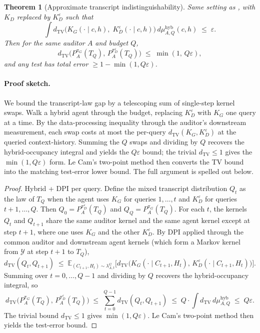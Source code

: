 \documentclass{article}
\theoremstyle{plain}
\newtheorem{theorem}{Theorem}
\theoremstyle{definition}
\theoremstyle{remark}
\newcommand{\TV}{\mathrm{TV}}
\newcommand{\dtv}{d_{\TV}}
\newcommand{\Y}{\mathcal{Y}}
\newcommand{\PpiA}[1]{P_A^{\pi_{#1}}}
\begin{document}
\begin{theorem}[Approximate transcript indistinguishability]\label{thm:approx}
Same setting as , with $K_D$ replaced by
$K_D^\varepsilon$ such that
\begin{equation}\label{eq:hybrid-cond}
\int \dtv\!\big(K_G(\cdot \mid c, h),\; K_D^\varepsilon(\cdot \mid c, h)\big)\, d\mu_{A, Q}^{\mathrm{hyb}}(c, h) \;\le\; \varepsilon.
\end{equation}
Then for the same auditor $A$ and budget $Q$,
\[
\dtv\big(\PpiA{G}(T_Q),\, P_A^{\pi_D^\varepsilon}(T_Q)\big) \;\le\; \min(1,\, Q\varepsilon),
\]
and any test has total error $\ge 1 - \min(1, Q\varepsilon)$.
\end{theorem}

\paragraph{Proof sketch.}
We bound the transcript-law gap by a telescoping sum of single-step kernel
swaps. Walk a hybrid agent through the budget, replacing $K_D^\varepsilon$
with $K_G$ one query at a time. By the data-processing inequality through
the auditor's downstream measurement, each swap costs at most the per-query
$\dtv(K_G, K_D^\varepsilon)$ at the queried context-history. Summing the
$Q$ swaps and dividing by $Q$ recovers the hybrid-occupancy integral and
yields the $Q\varepsilon$ bound; the trivial $\dtv \le 1$ gives the
$\min(1, Q\varepsilon)$ form. Le Cam's two-point method then converts the
TV bound into the matching test-error lower bound. The full argument is
spelled out below.

\begin{proof}
Hybrid + DPI per query. Define the mixed transcript distribution $Q_t$ as
the law of $T_Q$ when the agent uses $K_G$ for queries $1, \ldots, t$ and
$K_D^\varepsilon$ for queries $t+1, \ldots, Q$. Then $Q_0 = P_A^{\pi_D^\varepsilon}(T_Q)$
and $Q_Q = P_A^{\pi_G}(T_Q)$. For each $t$, the kernels $Q_t$ and $Q_{t+1}$
share the same auditor kernel and the same agent kernel except at step $t+1$,
where one uses $K_G$ and the other $K_D^\varepsilon$. By DPI applied through
the common auditor and downstream agent kernels (which form a Markov kernel
from $\Y$ at step $t+1$ to $T_Q$),
\[
\dtv(Q_t, Q_{t+1}) \;\le\; \mathbb{E}_{(C_{t+1}, H_t) \sim \lambda_{A,t}^{G}}\!
\big[\dtv\!\big(K_G(\cdot \mid C_{t+1}, H_t),\, K_D^\varepsilon(\cdot \mid C_{t+1}, H_t)\big)\big].
\]
Summing over $t = 0, \ldots, Q-1$ and dividing by $Q$ recovers the
hybrid-occupancy integral, so
\[
\dtv\!\big(\PpiA{G}(T_Q),\, P_A^{\pi_D^\varepsilon}(T_Q)\big)
\;\le\; \sum_{t=0}^{Q-1} \dtv(Q_t, Q_{t+1})
\;\le\; Q \cdot \int \dtv \, d\mu_{A,Q}^{\mathrm{hyb}}
\;\le\; Q\varepsilon.
\]
The trivial bound $\dtv \le 1$ gives $\min(1, Q\varepsilon)$. Le Cam's
two-point method then yields the test-error bound.
\end{proof}
\end{document}
